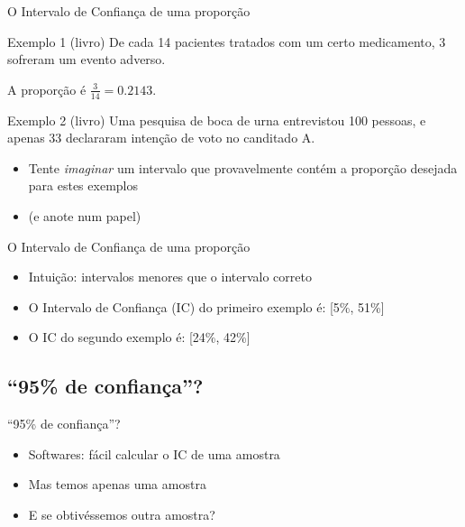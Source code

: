 \documentclass{beamer}
\begin{document}
\begin{frame}{\scriptsize O Intervalo de Confiança de uma proporção}
  \begin{exampleblock}{Exemplo 1 (livro)}
    \footnotesize
    De cada 14 pacientes tratados com um certo medicamento, 3 sofreram um evento adverso.

    \bigskip
    A proporção é $\frac{3}{14} = 0.2143$.
  \end{exampleblock}
  \bigskip
  \begin{exampleblock}{Exemplo 2 (livro)}
    \footnotesize
    Uma pesquisa de boca de urna entrevistou 100 pessoas, e apenas 33 declararam intenção de voto no canditado A.

  \end{exampleblock}
  \bigskip
  \begin{itemize}
    \footnotesize
    \item Tente {\em imaginar} um intervalo que \alert{provavelmente contém} a proporção desejada para estes exemplos
    \item (e anote num papel)
  \end{itemize}
\end{frame}

\begin{frame}{\scriptsize O Intervalo de Confiança de uma proporção}
  \begin{itemize}
    \footnotesize
  \item Intuição: intervalos menores que o intervalo correto
  \bigskip
  \item O \alert{Intervalo de Confiança} (IC) do primeiro exemplo é: [5\%, 51\%]
  \bigskip
  \item O IC do segundo exemplo é: [24\%, 42\%]
  \bigskip
  \end{itemize}
\end{frame}


\subsection{``95\% de confiança''?}

\begin{frame}{\scriptsize ``95\% de confiança''?}
  \begin{itemize}
    \footnotesize
  \item Softwares: fácil calcular o IC de uma amostra
  \bigskip
  \item Mas temos apenas \alert{uma} amostra
  \bigskip
  \item E se obtivéssemos outra amostra?
  \end{itemize}
\end{frame}
\end{document}

